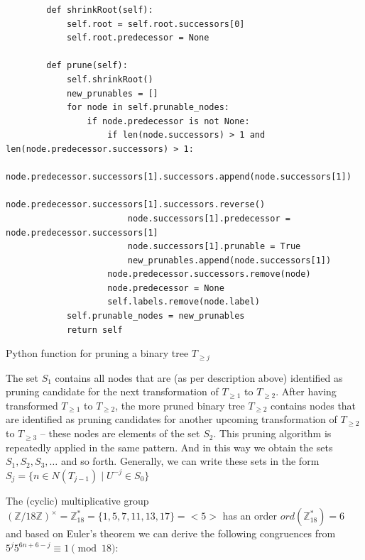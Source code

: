 \begin{listing}[H]
	\begin{verbatim}
		def shrinkRoot(self):
			self.root = self.root.successors[0]
			self.root.predecessor = None
		
		def prune(self):
			self.shrinkRoot()
			new_prunables = []
			for node in self.prunable_nodes:
				if node.predecessor is not None:
					if len(node.successors) > 1 and len(node.predecessor.successors) > 1:
						node.predecessor.successors[1].successors.append(node.successors[1])
						node.predecessor.successors[1].successors.reverse()
						node.successors[1].predecessor = node.predecessor.successors[1]
						node.successors[1].prunable = True
						new_prunables.append(node.successors[1])
					node.predecessor.successors.remove(node)
					node.predecessor = None
					self.labels.remove(node.label)
			self.prunable_nodes = new_prunables
			return self
	\end{verbatim}
	\caption{Python function for pruning a binary tree $T_{\ge j}$ \cite{Ref_Sultanow_Github}}
	\label{lst:pruning}
\end{listing}

The set $S_1$ contains all nodes that are (as per description above) identified as pruning candidate for the next transformation of $T_{\ge1}$ to $T_{\ge2}$. After having transformed $T_{\ge1}$ to $T_{\ge2}$, the more pruned binary tree $T_{\ge2}$ contains nodes that are identified as pruning candidates for another upcoming transformation of $T_{\ge2}$ to $T_{\ge3}$ -- these nodes are elements of the set $S_2$. This pruning algorithm is repeatedly applied in the same pattern. And in this way we obtain the sets $S_1,S_2,S_3,\ldots$ and so forth. Generally, we can write these sets in the form $S_j=\{n\in N(T_{j-1})\mid U^{-j}\in S_0\}$ 

The (cyclic) multiplicative group $(\mathbb{Z}/18\mathbb{Z})^\times=\mathbb{Z}^\ast_{18}=\{1,5,7,11,13,17\}=<5>$ has an order $ord(\mathbb{Z}^\ast_{18})=6$ and based on Euler's theorem we can derive the following congruences from $5^j5^{6n+6-j}\equiv1\pmod{18}$: